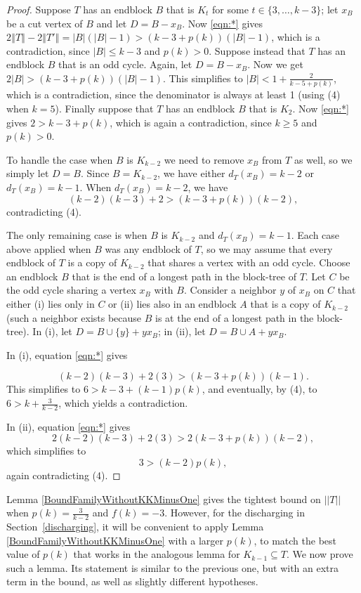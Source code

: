 \documentclass[12pt]{article}
\theoremstyle{plain}
\theoremstyle{definition}
\theoremstyle{remark}
\newcommand{\card}[1]{\left|#1\right|}
\newcommand{\size}[1]{\left\Vert#1\right\Vert}
\begin{document}
\begin{proof}
Suppose $T$ has an endblock $B$ that is $K_t$ for some $t \in \{3,\ldots,
k-3\}$; let $x_B$ be a cut vertex of $B$ and let $D=B-x_B$.
Now \eqref{eqn:*} gives $2\size{T}-2\size{T'} =
\card{B}(\card{B}-1)>(k-3+p(k))(|B|-1)$, which 
is a contradiction, since $|B|\le k-3$ and $p(k)>0$.
Suppose instead that $T$ has an endblock $B$ that is an odd cycle.  Again, let
$D=B-x_B$.  Now we get $2|B|>(k-3+p(k))(|B|-1)$.  This simplifies to $|B|<1+\frac2{k-5+p(k)}$, which is a contradiction, 
since the denominator is always at least 1 (using (4) when $k=5$).
Finally suppose that $T$ has an endblock $B$ that is $K_2$. Now \eqref{eqn:*} gives
$2 > k-3 + p(k)$, which is again a contradiction, since $k \ge 5$ and $p(k) > 0$.
	
To handle the case when $B$ is $K_{k-2}$ we need to remove $x_B$ from $T$ as
well, so we simply let $D=B$.  
Since $B=K_{k-2}$, we have either $d_T(x_B) = k - 2$ or $d_T(x_B) =
k-1$. When $d_T(x_B) = k - 2$, we have
	\[(k-2)(k-3) +2 > (k-3 + p(k))(k-2),\]
	contradicting (4).
	
The only remaining case is when $B$ is $K_{k-2}$ and $d_T(x_B) =
k - 1$.  Each case above applied when $B$ was any endblock of $T$, so we may
assume that every endblock of $T$ is a copy of $K_{k-2}$ that shares a vertex
with an odd cycle.  Choose an endblock $B$ that is the end of a longest path in
the block-tree of $T$.  Let $C$ be the odd cycle sharing a vertex $x_B$ with
$B$.  Consider a neighbor $y$ of $x_B$ on $C$ that either (i) lies only in $C$
or (ii) lies also in an endblock $A$ that is a copy of $K_{k-2}$ (such a
neighbor exists because $B$ is at the end of a longest path in the block-tree).
In (i), let $D=B\cup\{y\}+yx_B$; in (ii), let $D=B\cup A+yx_B$.

In (i), equation \eqref{eqn:*} gives

\[(k-2)(k-3)+2(3) > (k-3+p(k))(k-1).\]
%
This simplifies to $6>k-3+(k-1)p(k)$, and eventually, by (4), to $6>k+\frac3{k-2}$, which yields a contradiction.

In (ii), equation \eqref{eqn:*} gives
	\[2(k-2)(k-3) + 2(3) > 2(k-3 + p(k))(k-2),\]
	which simplifies to
	\[3 > (k-2)p(k),\]
	again contradicting (4).
\end{proof}

Lemma \ref{BoundFamilyWithoutKKMinusOne} gives the tightest bound on $||T||$
when $p(k) = \frac{3}{k-2}$ and $f(k) = -3$.   However, for the discharging in
Section~\ref{discharging}, it will be convenient to apply Lemma
\ref{BoundFamilyWithoutKKMinusOne} with a larger $p(k)$, to match the best value
of $p(k)$ that works in the analogous lemma for $K_{k-1}\subseteq T$.  We now
prove such a lemma.  Its statement is similar to the
previous one, but with an extra term in the bound, as well as slightly different hypotheses.
\end{document}
